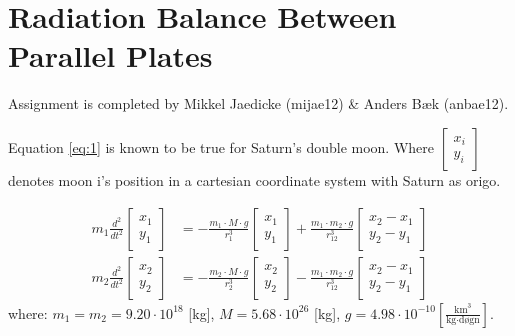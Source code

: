 \section*{Radiation Balance Between Parallel Plates}
Assignment is completed by Mikkel Jaedicke (mijae12) \& Anders Bæk (anbae12).

Equation \ref{eq:1} is known to be true for Saturn's double moon. Where $\left[ \begin{matrix} x_{ i } \\ y_{ i } \end{matrix} \right]$ denotes moon i's position in a cartesian coordinate system with Saturn as origo. 

\begin{equation}
\begin{align*}
m_{ 1 }\frac { { d }^{ 2 } }{ { dt }^{ 2 } } \left[ \begin{matrix} x_{ 1 } \\ y_{ 1 } \end{matrix} \right] &=-\frac { m_{ 1 }\cdot M\cdot g }{ { r }^{ 3 }_{ 1 } } \left[ \begin{matrix} x_{ 1 } \\ y_{ 1 } \end{matrix} \right] +\frac { m_{ 1 }\cdot m_2\cdot g }{ { r }^{ 3 }_{ 12 } } \left[ \begin{matrix} x_{ 2 }-x_{ 1 } \\ y_{ 2 }-y_{ 1 } \end{matrix} \right] \\
m_{ 2 }\frac { { d }^{ 2 } }{ { dt }^{ 2 } } \left[ \begin{matrix} x_{ 2 } \\ y_{ 2 } \end{matrix} \right] &=-\frac { m_{ 2 }\cdot M\cdot g }{ { r }^{ 3 }_{ 2 } } \left[ \begin{matrix} x_{ 2 } \\ y_{ 2 } \end{matrix} \right] -\frac { m_{ 1 }\cdot m_{ 2 }\cdot g }{ { r }^{ 3 }_{ 12 } } \left[ \begin{matrix} x_{ 2 }-x_{ 1 } \\ y_{ 2 }-y_{ 1 } \end{matrix} \right] 
\end{align*}
\label{eq:1}
\end{equation}
where: \( m_1 = m_2 =9.20 \cdot 10^{18} \) [kg], \( M = 5.68  \cdot 10^{26} \) [kg], \( g = 4.98 \cdot 10^{-10} \left[ \frac { \text{km}^3 }{ \text{kg} \cdot \text{døgn} }  \right] \).

